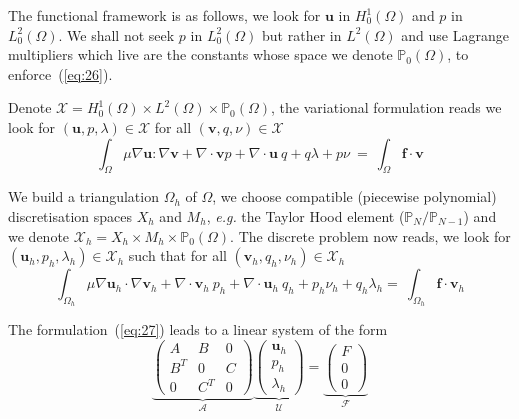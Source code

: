 The functional framework is as follows, we look for $\mathbf{u}$ in
$H^1_0(\Omega)$ and $p$ in $L^2_0(\Omega)$. We shall not seek $p$ in
$L^2_0(\Omega)$ but rather in $L^2(\Omega)$ and use Lagrange
multipliers which live are the constants whose space we denote
$\mathbb{P}_0(\Omega)$, to enforce~(\ref{eq:26}).

Denote $\mathcal{X} = H^1_0(\Omega)\times
L^2(\Omega)\times\mathbb{P}_0(\Omega)$, the variational formulation
reads we look for $(\mathbf{u}, p, \lambda) \in \mathcal{X}$ for all
$(\mathbf{v},q,\nu) \in \mathcal{X}$
\begin{equation}
  \label{eq:25}
  \int_\Omega \mu \nabla \mathbf{u} : \nabla \mathbf{v} + \nabla \cdot \mathbf{v} p + \nabla \cdot \mathbf{u}\ q + q \lambda + p \nu  \ = \ \int_\Omega \mathbf{f} \cdot \mathbf{v}
\end{equation}

We build a triangulation $\Omega_h$ of $\Omega$, we choose compatible
(piecewise polynomial) discretisation spaces $X_h$ and $M_h$,
\emph{e.g.} the Taylor Hood element ($\mathbb{P}_N/\mathbb{P}_{N-1}$)
and we denote $\mathcal{X}_h=X_h\times M_h \times
\mathbb{P}_0(\Omega)$.  The discrete problem now reads, we look for
$(\mathbf{u}_h,p_h,\lambda_h) \in \mathcal{X}_h$ such that for all
$(\mathbf{v}_h,q_h,\nu_h) \in \mathcal{X}_h$
\begin{equation}
  \label{eq:27}
  \int_{\Omega_h} \mu \nabla \mathbf{u}_h \cdot \nabla \mathbf{v}_h + \nabla \cdot \mathbf{v}_h \ p_h + \nabla \cdot \mathbf{u}_h\ q_h + p_h \nu_h + q_h \lambda_h   = \ \int_{\Omega_h} \mathbf{f} \cdot \mathbf{v}_h
\end{equation}

The formulation~(\ref{eq:27}) leads to a linear system of the form
\begin{equation}
  \label{eq:28}
  \underbrace{\begin{pmatrix}
    A & B & 0\\
    B^T & 0 & C\\
    0 & C^T & 0
  \end{pmatrix}}_{\mathcal{A}}
\underbrace{
  \begin{pmatrix}
    \mathbf{u}_h\\
    p_h\\
    \lambda_h
  \end{pmatrix}}_{\mathcal{U}} =
\underbrace{\begin{pmatrix}
    F\\
    0\\
    0
  \end{pmatrix}}_{\mathcal{F}}
\end{equation}

